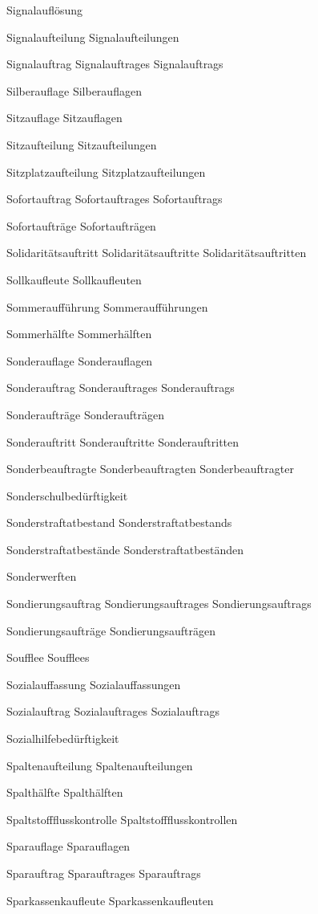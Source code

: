 Signalauflösung

Signalaufteilung
Signalaufteilungen

Signalauftrag
Signalauftrages
Signalauftrags

Silberauflage
Silberauflagen

Sitzauflage
Sitzauflagen

Sitzaufteilung
Sitzaufteilungen

Sitzplatzaufteilung
Sitzplatzaufteilungen

Sofortauftrag
Sofortauftrages
Sofortauftrags

Sofortaufträge
Sofortaufträgen

Solidaritätsauftritt
Solidaritätsauftritte
Solidaritätsauftritten

Sollkaufleute
Sollkaufleuten

Sommeraufführung
Sommeraufführungen

Sommerhälfte
Sommerhälften

Sonderauflage
Sonderauflagen

Sonderauftrag
Sonderauftrages
Sonderauftrags

Sonderaufträge
Sonderaufträgen

Sonderauftritt
Sonderauftritte
Sonderauftritten

Sonderbeauftragte
Sonderbeauftragten
Sonderbeauftragter

Sonderschulbedürftigkeit

Sonderstraftatbestand
Sonderstraftatbestands

Sonderstraftatbestände
Sonderstraftatbeständen

Sonderwerften

Sondierungsauftrag
Sondierungsauftrages
Sondierungsauftrags

Sondierungsaufträge
Sondierungsaufträgen

Soufflee
Soufflees

Sozialauffassung
Sozialauffassungen

Sozialauftrag
Sozialauftrages
Sozialauftrags

Sozialhilfebedürftigkeit

Spaltenaufteilung
Spaltenaufteilungen

Spalthälfte
Spalthälften

Spaltstoffflusskontrolle
Spaltstoffflusskontrollen

Sparauflage
Sparauflagen

Sparauftrag
Sparauftrages
Sparauftrags

Sparkassenkaufleute
Sparkassenkaufleuten

